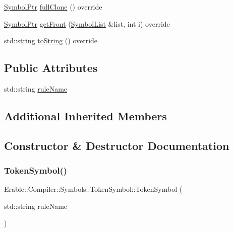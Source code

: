 \begin{DoxyCompactItemize}
\item 
\mbox{\hyperlink{namespace_erable_1_1_compiler_1_1_symbols_a8f0bc762f448ea4d84e8713ab3e140b9}{Symbol\+Ptr}} \mbox{\hyperlink{class_erable_1_1_compiler_1_1_symbols_1_1_token_symbol_a5907d3f99334de4f74fba1c1598de83a}{full\+Clone}} () override
\item 
\mbox{\hyperlink{namespace_erable_1_1_compiler_1_1_symbols_a8f0bc762f448ea4d84e8713ab3e140b9}{Symbol\+Ptr}} \mbox{\hyperlink{class_erable_1_1_compiler_1_1_symbols_1_1_token_symbol_adc686a4c091111b65323fe75ddfef6b9}{get\+Front}} (\mbox{\hyperlink{namespace_erable_1_1_compiler_1_1_symbols_a63e8157d2f729d4689d27bacad42f8ed}{Symbol\+List}} \&list, int i) override
\item 
std\+::string \mbox{\hyperlink{class_erable_1_1_compiler_1_1_symbols_1_1_token_symbol_a0f8499152ff070ae70295c9b25b25b93}{to\+String}} () override
\end{DoxyCompactItemize}
\subsection*{Public Attributes}
\begin{DoxyCompactItemize}
\item 
std\+::string \mbox{\hyperlink{class_erable_1_1_compiler_1_1_symbols_1_1_token_symbol_aedef0a5b3fef634067b62c93934ecb08}{rule\+Name}}
\end{DoxyCompactItemize}
\subsection*{Additional Inherited Members}


\subsection{Constructor \& Destructor Documentation}
\mbox{\label{class_erable_1_1_compiler_1_1_symbols_1_1_token_symbol_a4c1e8ae7336204598cc0f614a9edbb26}} 
\subsubsection{\texorpdfstring{TokenSymbol()}{TokenSymbol()}\hspace{0.1cm}{\footnotesize\ttfamily [1/2]}}
{\footnotesize\ttfamily Erable\+::\+Compiler\+::\+Symbols\+::\+Token\+Symbol\+::\+Token\+Symbol (\begin{DoxyParamCaption}\item[{std\+::string}]{rule\+Name }\end{DoxyParamCaption})\hspace{0.3cm}{\ttfamily [explicit]}}


